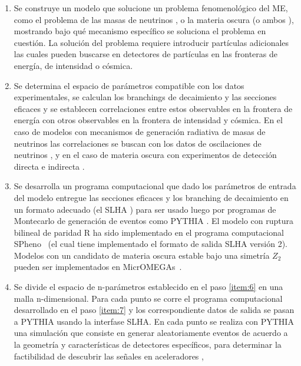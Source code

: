 \begin{enumerate}
\item Se construye un modelo que solucione un problema fenomenológico
  del ME, como el problema de las masas de neutrinos
  \cite{Hirsch:2000ef}, o la materia oscura (o ambos
  \cite{Hirsch:2005ag,Restrepo:2011rj}), mostrando bajo qué mecanismo
  específico se soluciona el problema en cuestión. La solución del
  problema requiere introducir partículas adicionales las cuales
  pueden buscarse en detectores de partículas en las fronteras de
  energía, de intensidad o cósmica.
  \label{item:5}
\item Se determina el espacio de parámetros compatible con los datos
  experimentales, se calculan los branchings de decaimiento y las
  secciones eficaces y se establecen correlaciones entre estos
  observables en la frontera de energía con otros observables en la
  frontera de intensidad y cósmica. En el caso de modelos con
  mecanismos de generación radiativa de masas de neutrinos las
  correlaciones se buscan con los datos de oscilaciones de neutrinos
  \cite{Diaz:2003as}, y en el caso de materia oscura con experimentos
  de detección directa e indirecta \cite{Choi:2010xn,Restrepo:2011rj}.
  \label{item:6}
\item Se desarrolla un programa computacional que dado los parámetros
  de entrada del modelo entregue las secciones eficaces y los
  branching de decaimiento en un formato adecuado (el SLHA
  \cite{Allanach:2008qq}) para ser usado luego por programas de Montecarlo
  de generación de eventos como PYTHIA \cite{Sjostrand:2006za}. El
  modelo con ruptura bilineal de paridad R ha sido implementado en el
  programa computacional SPheno~\cite{Porod:2003um} (el cual tiene
  implementado el formato de salida SLHA versión 2). Modelos con un
  candidato de materia oscura estable bajo una simetría $Z_2$ pueden
  ser implementados en MicrOMEGAs~\cite{Belanger:2006is,Belanger:2008sj,Belanger:2010gh}.
  \label{item:7}
\item Se divide el espacio de n-parámetros establecido en el paso
  \ref{item:6} en una malla n-dimensional. Para cada punto se corre el
  programa computacional desarrollado en el paso \ref{item:7} y los
  correspondiente datos de salida se pasan a PYTHIA usando la
  interfase SLHA. En cada punto se realiza con PYTHIA una simulación
  que consiste en generar aleatoriamente eventos de acuerdo a la
  geometría y características de detectores específicos, para
  determinar la factibilidad de descubrir las señales en aceleradores
  \cite{Magro:2003zb,deCampos:2005ri,deCampos:2007bn,deCampos:2008ic,deCampos:2008re},

\end{enumerate}
